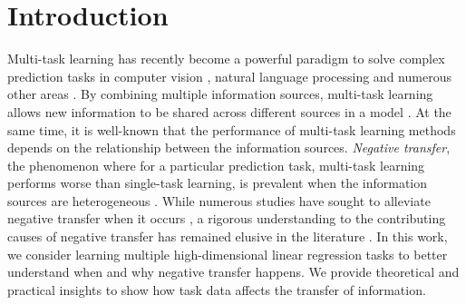\section{Introduction}

Multi-task learning has recently become a powerful paradigm to solve complex prediction tasks in computer vision \cite{chexnet17,ZSSGM18}, natural language processing \cite{GLUE,superglue} and numerous other areas \cite{ZY17}.
By combining multiple information sources, multi-task learning allows new information to be shared across different sources in a model \cite{C97}.
At the same time, it is well-known that the performance of multi-task learning methods depends on the relationship between the information sources.
\textit{Negative transfer}, the phenomenon where for a particular prediction task, multi-task learning performs worse than single-task learning, is prevalent when the information sources are heterogeneous \cite{AP16,BS17}.
While numerous studies have sought to alleviate negative transfer when it occurs \cite{YKGLHF20}, a rigorous understanding to the contributing causes of negative transfer has remained elusive in the literature \cite{R17}.
In this work, we consider learning multiple high-dimensional linear regression tasks to better understand when and why negative transfer happens. %
We provide theoretical and practical insights to show how task data affects the transfer of information.

